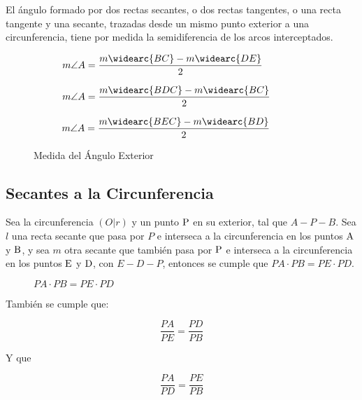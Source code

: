 \begin{theorem}
    El ángulo formado por dos rectas secantes, o dos rectas tangentes, o una recta tangente y una secante, trazadas desde un mismo punto exterior a una circunferencia, tiene por medida la semidiferencia de los arcos interceptados.


    \begin{figure}[h!]

        \centering

        \begin{subfigure}[b]{.33\textwidth}
            \centering
            
            \label{fig:plot717}
            \caption{$m\angle{A}=\dfrac{m\widearc{BC}-m\widearc{DE}}{2}$}
        \end{subfigure}%
        \begin{subfigure}[b]{.33\textwidth}
            \centering
            
            \label{fig:plot718}
            \caption{$m\angle{A}=\dfrac{m\widearc{BDC}-m\widearc{BC}}{2}$}
        \end{subfigure}%
        \begin{subfigure}[b]{.33\textwidth}
            \centering
            
            \label{fig:plot719}
            \caption{$m\angle{A}=\dfrac{m\widearc{BEC}-m\widearc{BD}}{2}$}
        \end{subfigure}

        \centering
        \caption{Medida del Ángulo Exterior}
        \label{fig:exterior-angulo-medida}
        
    \end{figure}        
   
    
\end{theorem}

\clearpage

\subsection{Secantes a la Circunferencia}

\begin{theorem}
    Sea la circunferencia $(O|r)$ y un punto $\rm P$ en su exterior, tal que $A-P-B$. Sea $l$ una recta secante que pasa por $P$ e interseca a la circunferencia en los puntos $\rm A$ y $\rm B$, y sea $m$ otra secante que también pasa por $\rm P$ e interseca a la circunferencia en los puntos $\rm E$ y $\rm D$, con $E-D-P$, entonces se cumple que $PA \cdot PB = PE \cdot PD$.

    \begin{figure}[!h]
        \centering
        
        \caption{$PA \cdot PB = PE \cdot PD$}
        \label{fig:potencia-de-un-punto}
    \end{figure}


    También se cumple que:

    $$\dfrac{PA}{PE}=\dfrac{PD}{PB}$$

    Y que 

    $$\dfrac{PA}{PD}=\dfrac{PE}{PB}$$
    
\end{theorem}

